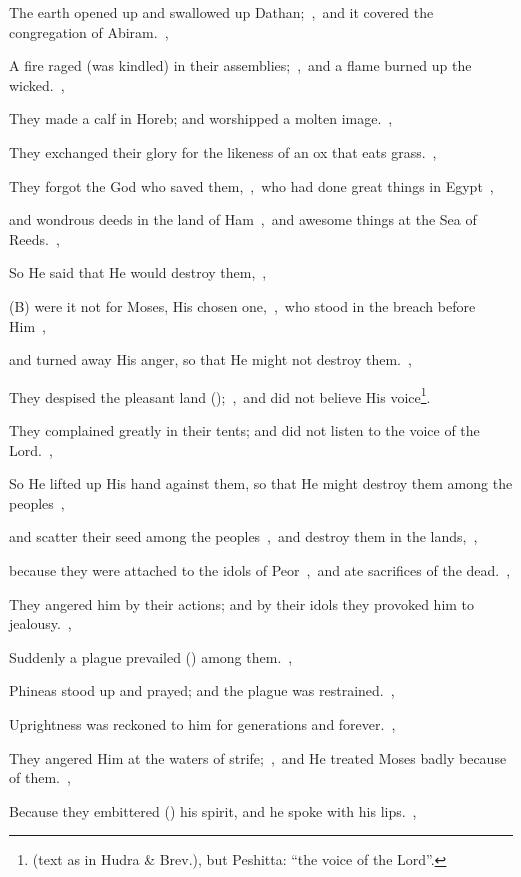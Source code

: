 \documentclass[12pt,twoside,a5paper]{article}
\begin{document}
\begin{normalparskip}
  The earth opened up and swallowed up Dathan;~\sep\ and it covered the congregation of Abiram.~\sep

  A fire raged (was kindled) in their assemblies;~\sep\ and a flame burned up the wicked.~\sep

  They made a calf in Horeb; and worshipped a molten image.~\sep

  They exchanged their glory for the likeness of an ox that eats grass.~\sep

  They forgot the God who saved them,~\sep\ who had done great things in Egypt~\sep

  and wondrous deeds in the land of Ham~\sep\ and awesome things at the Sea of Reeds.~\sep

  So He said that He would destroy them,~\sep

  (B) were it not for Moses, His chosen one,~\sep\ who stood in the breach before Him~\sep

  and turned away His anger, so that He might not destroy them.~\sep

  They despised the pleasant land ();~\sep\ and did not believe His voice\footnote{(text as in Hudra \& Brev.), but Peshitta: ``the voice of the Lord''.}.

  They complained greatly in their tents; and did not listen to the voice of the Lord.~\sep

  So He lifted up His hand against them, so that He might destroy them among the peoples~\sep

  and scatter their seed among the peoples~\sep\ and destroy them in the lands,~\sep

  because they were attached to the idols of Peor~\sep\ and ate sacrifices of the dead.~\sep

  They angered him by their actions; and by their idols they provoked him to jealousy.~\sep

  Suddenly a plague prevailed () among them.~\sep

  Phineas stood up and prayed; and the plague was restrained.~\sep

  Uprightness was reckoned to him for generations and forever.~\sep

  They angered Him at the waters of strife;~\sep\ and He treated Moses badly because of them.~\sep

  Because they embittered () his spirit, and he spoke with his lips.~\sep


\end{normalparskip}
\end{document}
